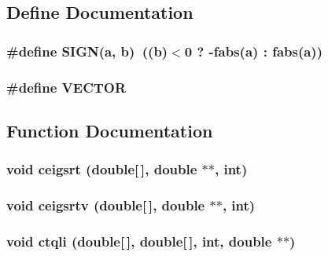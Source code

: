 \subsection{Define Documentation}
\subsubsection{\setlength{\rightskip}{0pt plus 5cm}\#define SIGN(a, b)~((b)$<$0 ? -fabs(a) : fabs(a))}\label{ceigsys_8c_c89d5f8a358eb8a1abdcd0fcef134f1a}


\subsubsection{\setlength{\rightskip}{0pt plus 5cm}\#define VECTOR}\label{ceigsys_8c_c6e89954deaa373db52a91ac6db50884}




\subsection{Function Documentation}
\subsubsection{\setlength{\rightskip}{0pt plus 5cm}void ceigsrt (double[$\,$], double $\ast$$\ast$, int)}\label{ceigsys_8c_2eae5fea1789b08b0e071d30762b4a7f}


\subsubsection{\setlength{\rightskip}{0pt plus 5cm}void ceigsrtv (double[$\,$], double $\ast$$\ast$, int)}\label{ceigsys_8c_08ba395911e38cdb1e4bf03f333fee8c}


\subsubsection{\setlength{\rightskip}{0pt plus 5cm}void ctqli (double[$\,$], double[$\,$], int, double $\ast$$\ast$)}\label{ceigsys_8c_7b301a63a01c1c2c3fb94a29ffcc3aaf}


